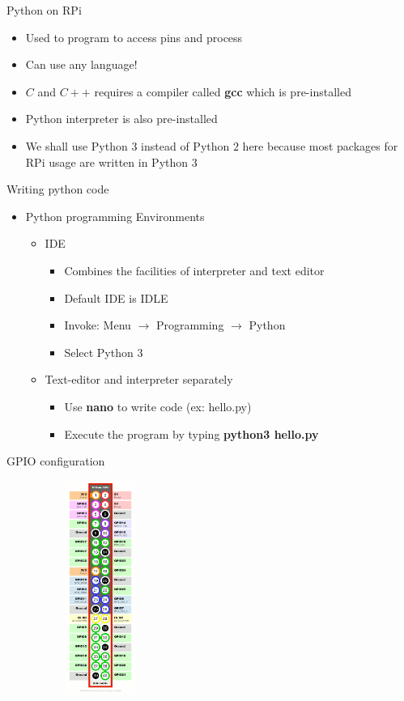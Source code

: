 \begin{frame}{Python on RPi}
	\begin{itemize}
		\item Used to program to access pins and process
		\item Can use any language!
		\item $C$ and $C++$ requires a compiler called \textbf{gcc} which is pre-installed
		\item Python interpreter is also pre-installed
		\item We shall use Python $3$ instead of Python $2$ here because most packages for RPi usage are written in Python $3$
	\end{itemize}
\end{frame}

\begin{frame}{Writing python code}
	\begin{itemize}
		\item Python programming Environments
		\begin{itemize}
			\item IDE
			\begin{itemize}
				\item Combines the facilities of interpreter and text editor
				\item Default IDE is IDLE
				\item Invoke: Menu $\rightarrow$ Programming $\rightarrow$ Python
				\item Select Python $3$
			\end{itemize}
			\item Text-editor and interpreter separately
			\begin{itemize}
				\item Use \textbf{nano} to write code (ex: hello.py)
				\item Execute the program by typing \textbf{python3 hello.py}
			\end{itemize}
		\end{itemize}
	\end{itemize}
\end{frame}

\begin{frame}{GPIO configuration}
	\begin{figure}
		\centering
		\includegraphics[width=4cm,height=7cm,keepaspectratio]{gpio}
	\end{figure}
\end{frame}

